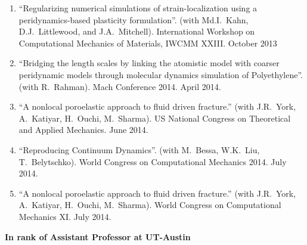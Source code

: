 \begin{enumerate}[resume]
    \item ``Regularizing numerical simulations of strain-localization using a peridynamics-based plasticity formulation''. (with Md.I.~Kahn, D.J.~Littlewood, and J.A.~Mitchell). International Workshop on Computational Mechanics of Materials, IWCMM XXIII. October 2013
    \item ``Bridging the length scales by linking the atomistic model with coarser peridynamic models through molecular dynamics simulation of Polyethylene''. (with R.~Rahman). Mach Conference 2014.  April 2014.
    \item ``A nonlocal poroelastic approach to fluid driven fracture.'' (with J.R.~York, A.~Katiyar, H.~Ouchi, M.~Sharma). US National Congress on Theoretical and Applied Mechanics.  June 2014.
    \item ``Reproducing Continuum Dynamics''. (with M.~Bessa, W.K.~Liu, T.~Belytschko). World Congress on Computational Mechanics 2014.  July 2014.
    \item ``A nonlocal poroelastic approach to fluid driven fracture.'' (with J.R.~York, A.~Katiyar, H.~Ouchi, M.~Sharma). World Congress on Computational Mechanics XI.  July 2014.
\end{enumerate}
    \pagebreak[2]
    \textbf{In rank of Assistant Professor at UT-Austin}
